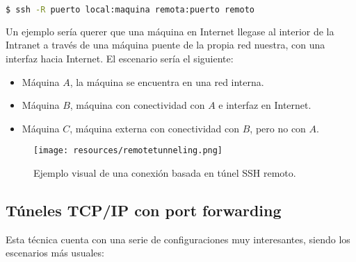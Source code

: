 \documentclass[a4paper, 11pt, titlepage]{article}
\begin{document}
        \begin{lstlisting}[language=bash,basicstyle=\footnotesize]
    $ ssh -R puerto local:maquina remota:puerto remoto\end{lstlisting}
        
        Un ejemplo sería querer que una máquina en Internet llegase al interior de la Intranet a través de una 
        máquina puente de la propia red nuestra, con una interfaz hacia Internet. El escenario sería el siguiente:

        \begin{itemize}
            \item Máquina $A$, la máquina se encuentra en una red interna.
            \item Máquina $B$, máquina con conectividad con $A$ e interfaz en Internet.
            \item Máquina $C$, máquina externa con conectividad con $B$, pero no con $A$.
        \end{itemize}

        \begin{figure}[htp]
            \centering
            \texttt{[image: resources/remotetunneling.png]}
            \caption{Ejemplo visual de una conexión basada en túnel SSH remoto.}
            \label{remotetunneling}
        \end{figure}

    \subsection{Túneles TCP/IP con port forwarding}\label{sshforwarding}

        Esta técnica cuenta con una serie de configuraciones muy interesantes, siendo los escenarios más usuales:
\end{document}
